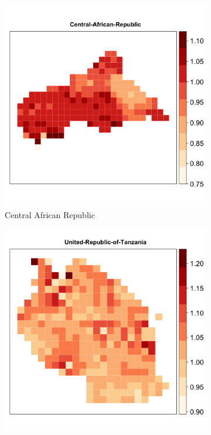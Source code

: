 \documentclass[11pt, oneside]{article}   	%
\begin{document}
\begin{figure}[t]
\centering
\caption{Spatial Distribution of $\Lambda_{i}$ for Sample Countries}

\begin{subfigure}[c]{0.32\textwidth}
\includegraphics[width=\textwidth]{../../Analysis/output/zeta_heatmaps/Central-African-Republic_zeta.png}
\caption{Central African Republic}
\label{fig:Central African Republic_zeta}
\end{subfigure}
\begin{subfigure}[c]{0.32\textwidth}
\includegraphics[width=\textwidth]{../../Analysis/output/zeta_heatmaps/United-Republic-of-Tanzania_zeta.png}

\end{subfigure}
\end{figure}
\end{document}
